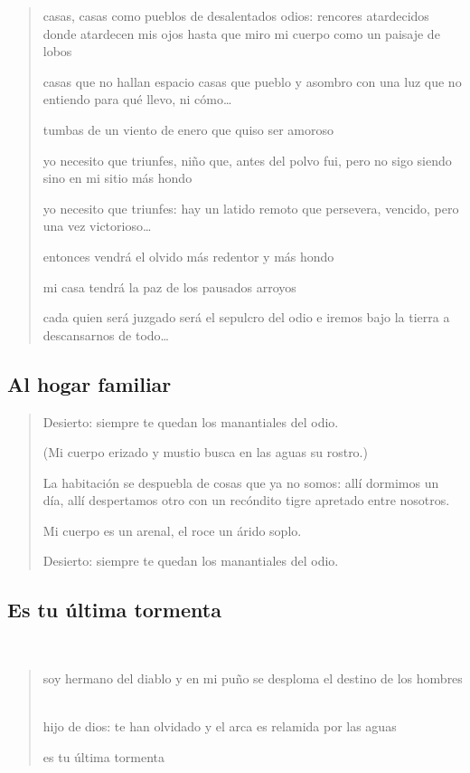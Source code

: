 \documentclass[a4paper, 12pt]{article}
\begin{document}
\begin{verse}

casas, casas como pueblos 
de desalentados odios:
rencores atardecidos
donde atardecen mis ojos
hasta que miro mi cuerpo
como un paisaje de lobos
~

casas que no hallan espacio
casas que pueblo y asombro 
con una luz que no entiendo 
para qué llevo, ni cómo\ldots
~

tumbas de un viento de enero 
que quiso ser amoroso
~

yo necesito que triunfes,
niño que, antes del polvo 
fui, pero no sigo siendo 
sino en mi sitio más hondo 
~

yo necesito que triunfes:
hay un latido remoto 
que persevera, vencido, 
pero una vez victorioso\ldots
~

entonces vendrá el olvido 
más redentor y más hondo 
~ 

mi casa tendrá la paz 
de los pausados arroyos
~

cada quien será juzgado
será el sepulcro del odio
e iremos bajo la tierra
a descansarnos de todo\ldots




\end{verse}


\pagebreak
\subsection{Al hogar familiar}

\begin{verse}
   

Desierto: siempre te quedan 
los manantiales del odio. 
~ 

(Mi cuerpo erizado y mustio
busca en las aguas su rostro.)
~

La habitación se despuebla
de cosas que ya no somos:
allí dormimos un día,
allí despertamos otro 
con un recóndito tigre
apretado entre nosotros.
~ 

Mi cuerpo es un arenal,
el roce un árido soplo.
~ 

Desierto: siempre te quedan 
los manantiales del odio.


\end{verse}

\pagebreak
\subsection{Es tu última tormenta}
~ 

\begin{verse}
    
soy hermano del diablo y en mi puño
se desploma el destino de los hombres
~

hijo de dios: te han olvidado
y el arca es relamida por las aguas
~

es tu última tormenta
\end{verse}
\end{document}
